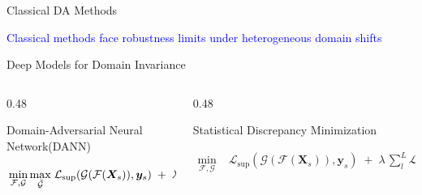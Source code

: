 \documentclass[aspectratio=169]{beamer}
\let\oldcite\cite %
\renewcommand{\cite}[1]{{\tiny\oldcite{#1}}}
\providecommand{\ve}[1]{{\bm{#1}}}
\begin{document}
\begin{frame}{Classical DA Methods}
\begin{figure}
\vspace{-1em}
\end{figure}
\begin{center}
    \textcolor{blue}{Classical methods face robustness limits under heterogeneous domain shifts~\cite{mahmoodiyan2025feature}}
\end{center}

\end{frame}

\begin{frame}{Deep Models for Domain Invariance}
  
    \begin{columns}[T]
    \footnotesize
        \begin{column}{0.48\textwidth}
            \begin{block}{Domain-Adversarial Neural Network(DANN)}
                \begin{minipage}{\linewidth}
                \begin{align*}
                    \vphantom{\sum_{l}}
                    \min_{\mathcal{F}, \mathcal{G}} \max_{\tilde{\mathcal{G}}} \; & \mathcal{L}_{\mathrm{sup}}(\mathcal{G}(\mathcal{F}(\ve{X}_s)), \ve{y}_s) \;+\;\lambda\; \mathcal{L}_{\mathrm{ad}}(\tilde{\mathcal{G}}(\mathcal{F}(\ve{X})))
                \end{align*}
                \end{minipage}
            \end{block}
        \end{column}
        
        \hfill %
        
        \begin{column}{0.48\textwidth}
            \begin{block}{Statistical Discrepancy Minimization}
                \begin{minipage}{\linewidth}
                \begin{align*}
                    \min_{\mathcal{F}, \mathcal{G}}\; & \mathcal{L}_{\mathrm{sup}}(\mathcal{G}(\mathcal{F}(\ve{X}_s)), \ve{y}_s) \;+\;\lambda\,\sum_{l}^L \mathcal{L}_{\mathrm{stat}}\bigl(f_l(\ve{X}_s),f_l(\ve{X}_t)\bigr)
                \end{align*}
                \end{minipage}
            \end{block}
        \end{column}
    \end{columns}


\end{frame}
\end{document}
